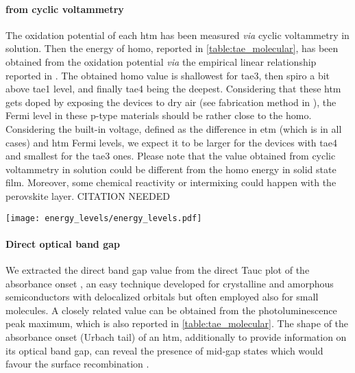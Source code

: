 	\paragraph{ from cyclic voltammetry}
	The oxidation potential of each \gls{htm} has been measured \textsl{via} cyclic voltammetry in solution.
	Then the energy of \gls{homo}, reported in \cref{table:tae_molecular}, has been obtained from the oxidation potential \textsl{via} the empirical linear relationship reported in .
	The obtained \gls{homo} value is shallowest for \gls{tae3}, then \gls{spiro} a bit above \gls{tae1} level, and finally \gls{tae4} being the deepest.
	Considering that these \gls{htm} gets doped by exposing the devices to dry air (see fabrication method in ), the Fermi level in these p-type materials should be rather close to the \gls{homo}.
	Considering the built-in voltage, defined as the difference in \gls{etm} (which is  in all cases) and \gls{htm} Fermi levels, we expect it to be larger for the devices with \gls{tae4} and smallest for the \gls{tae3} ones.
	Please note that the value obtained from cyclic voltammetry in solution could be different from the \gls{homo} energy in solid state film.
	Moreover, some chemical reactivity or intermixing could happen with the perovskite layer. CITATION NEEDED

	\begin{SCfigure}
		\centering
		\texttt{[image: energy\_levels/energy\_levels.pdf]}
		\label{fig:tae-energy_levels}
	\end{SCfigure}

	\paragraph{Direct optical band gap}
	We extracted the direct band gap value from the direct Tauc plot of the absorbance onset \cite{WikipediaTauc}, an easy technique developed for crystalline and amorphous semiconductors \cite{Stenzel2005} with delocalized orbitals but often employed also for small molecules.
	A closely related value can be obtained from the photoluminescence peak maximum, which is also reported in \cref{table:tae_molecular}.
	The shape of the absorbance onset (Urbach tail) of an \gls{htm}, additionally to provide information on its optical band gap, can reveal the presence of mid-gap states which would favour the surface recombination \cite{Tvingstedt2017}.

